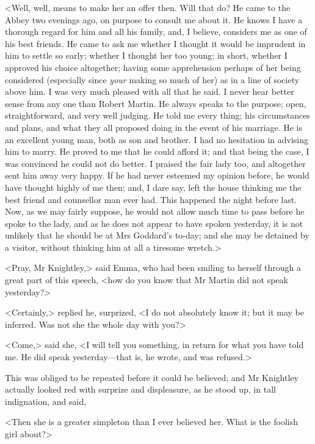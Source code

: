 <Well, well, means to make her an offer then. Will that do? He came to the Abbey two evenings ago, on purpose to consult me about it. He knows I have a thorough regard for him and all his family, and, I believe, considers me as one of his best friends. He came to ask me whether I thought it would be imprudent in him to settle so early; whether I thought her too young: in short, whether I approved his choice altogether; having some apprehension perhaps of her being considered (especially since \textit{your} making so much of her) as in a line of society above him. I was very much pleased with all that he said. I never hear better sense from any one than Robert Martin. He always speaks to the purpose; open, straightforward, and very well judging. He told me every thing; his circumstances and plans, and what they all proposed doing in the event of his marriage. He is an excellent young man, both as son and brother. I had no hesitation in advising him to marry. He proved to me that he could afford it; and that being the case, I was convinced he could not do better. I praised the fair lady too, and altogether sent him away very happy. If he had never esteemed my opinion before, he would have thought highly of me then; and, I dare say, left the house thinking me the best friend and counsellor man ever had. This happened the night before last. Now, as we may fairly suppose, he would not allow much time to pass before he spoke to the lady, and as he does not appear to have spoken yesterday, it is not unlikely that he should be at Mrs Goddard's to-day; and she may be detained by a visitor, without thinking him at all a tiresome wretch.>

<Pray, Mr Knightley,> said Emma, who had been smiling to herself through a great part of this speech, <how do you know that Mr Martin did not speak yesterday?>

<Certainly,> replied he, surprized, <I do not absolutely know it; but it may be inferred. Was not she the whole day with you?>

<Come,> said she, <I will tell you something, in return for what you have told me. He did speak yesterday—that is, he wrote, and was refused.>

This was obliged to be repeated before it could be believed; and Mr Knightley actually looked red with surprize and displeasure, as he stood up, in tall indignation, and said,

<Then she is a greater simpleton than I ever believed her. What is the foolish girl about?>

